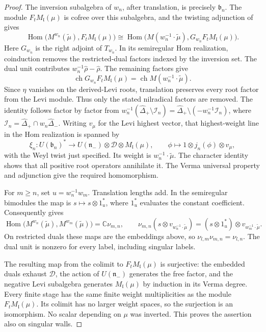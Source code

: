 \documentclass[11pt,a4paper]{amsart}
\numberwithin{equation}{section}
\theoremstyle{definition}
\theoremstyle{remark}
\newcommand{\C}{\mathbb C}
\newcommand{\lev}{\mathfrak l}
\newcommand{\ch}{\operatorname{ch}}
\newcommand{\Hom}{\operatorname{Hom}}
\begin{document}
\begin{proof}
The inversion subalgebra of $w_n$, after translation, is precisely
$\mathfrak b_n$. The module $F_tM_\lev(\mu)$ is cofree over this subalgebra, and
the twisting adjunction of \cite[Lemma~4.1]{ABGG} gives
$$
 \Hom\bigl(M^{w_n}(\widetilde\mu),F_tM_{\lev}(\mu)\bigr)
 \cong
 \Hom\bigl(M(w_n^{-1}\!\cdot\widetilde\mu),
                    G_{w_n}F_tM_{\lev}(\mu)\bigr).
$$
Here $G_{w_n}$ is the right adjoint of $T_{w_n}$. In its
semiregular Hom realization, coinduction removes the restricted-dual
factors indexed by the inversion set. The dual unit contributes
$w_n^{-1}\widehat\rho-\widehat\rho$. The remaining factors give
$$
 \ch G_{w_n}F_tM_{\lev}(\mu)
       =\ch M(w_n^{-1}\!\cdot\widetilde\mu).
$$
Since $\eta$ vanishes on the derived-Levi roots, translation
preserves every root factor from the Levi module. Thus only the stated
nilradical factors are removed. The identity follows factor by factor from
$w_n^{-1}(\widehat\Delta_+\setminus\mathcal I_n)
=\widehat\Delta_+\setminus(-w_n^{-1}\mathcal I_n)$,
where $\mathcal I_n=\widehat\Delta_+\cap w_n\widehat\Delta_-$.
Writing $v_\mu$ for the Levi highest vector, that highest-weight line
in the Hom realization is spanned by
$$
 \xi_n:U(\mathfrak b_n)^*\longrightarrow
 U(\mathfrak n_-)\otimes\mathcal D\otimes M_\lev(\mu),
 \qquad \phi\longmapsto1\otimes j_n(\phi)\otimes v_\mu,
$$
with the Weyl twist just specified. Its weight is
$w_n^{-1}\!\cdot\widetilde\mu$. The character identity shows that
all positive root operators annihilate it. The Verma universal
property and adjunction give the required homomorphism.

For $m\ge n$, set $u=w_n^{-1}w_m$. Translation lengths add.
In the semiregular bimodules the map is $s\mapsto s\otimes1_u^*$,
where $1_u^*$ evaluates the constant coefficient. Consequently
\cite[\S4.1, equation~(23), and \S4.4]{ABGG} gives
$$
 \Hom\bigl(M^{w_n}(\widetilde\mu),M^{w_m}(\widetilde\mu)\bigr)
 =\C\nu_{m,n},\qquad
 \nu_{m,n}(s\otimes v_{w_n^{-1}\cdot\widetilde\mu})
 =(s\otimes1_u^*)\otimes v_{w_m^{-1}\cdot\widetilde\mu}.
$$
On restricted duals these maps are the embeddings above, so
$\nu_{l,m}\nu_{m,n}=\nu_{l,n}$. The dual unit is nonzero for every
label, including singular labels.

The resulting map from the colimit to $F_tM_{\lev}(\mu)$ is
surjective: the embedded duals exhaust $\mathcal D$, the action of $U(\mathfrak n_-)$ generates the free factor, and
the negative Levi subalgebra generates $M_\lev(\mu)$ by induction
in its Verma degree.
Every finite stage has the same finite weight multiplicities as
the module $F_tM_\lev(\mu)$. Its colimit has no larger weight spaces, so the
surjection is an isomorphism. No scalar depending on $\mu$ was
inverted. This proves the assertion also on singular walls.
\end{proof}
\end{document}
